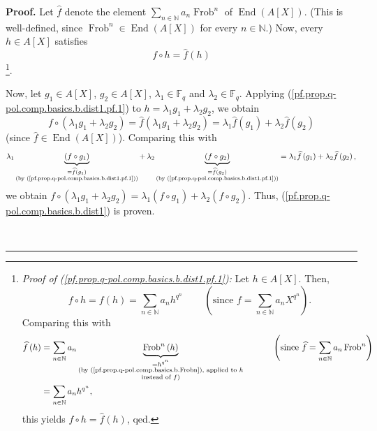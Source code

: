 \documentclass[numbers=enddot,12pt,final,onecolumn,notitlepage]{scrartcl}%
\theoremstyle{definition}
\newenvironment{proof}[1][Proof]{\noindent\textbf{#1.} }{\ \rule{0.5em}{0.5em}}
\let\sumnonlimits\sum
\renewcommand{\sum}{\sumnonlimits\limits}
\begin{document}
\begin{proof}
Let $\widehat{f}$ denote the element $\sum_{n\in\mathbb{N}}a_{n}%
\operatorname*{Frob}\nolimits^{n}$ of $\operatorname*{End}\left(  A\left[
X\right]  \right)  $. (This is well-defined, since $\operatorname*{Frob}%
\nolimits^{n}\in\operatorname*{End}\left(  A\left[  X\right]  \right)  $ for
every $n\in\mathbb{N}$.) Now, every $h\in A\left[  X\right]  $ satisfies%
\begin{equation}
f\circ h=\widehat{f}\left(  h\right)
\label{pf.prop.q-pol.comp.basics.b.dist1.pf.1}%
\end{equation}
\footnote{\textit{Proof of (\ref{pf.prop.q-pol.comp.basics.b.dist1.pf.1}):}
Let $h\in A\left[  X\right]  $. Then,%
\[
f\circ h=f\left(  h\right)  =\sum_{n\in\mathbb{N}}a_{n}h^{q^{n}}%
\ \ \ \ \ \ \ \ \ \ \left(  \text{since }f=\sum_{n\in\mathbb{N}}a_{n}X^{q^{n}%
}\right)  .
\]
Comparing this with%
\begin{align*}
\widehat{f}\left(  h\right)   &  =\sum_{n\in\mathbb{N}}a_{n}%
\underbrace{\operatorname*{Frob}\nolimits^{n}\left(  h\right)  }%
_{\substack{=h^{q^{n}}\\\text{(by (\ref{pf.prop.q-pol.comp.basics.b.Frobn}),
applied to }h\\\text{instead of }f\text{)}}}\ \ \ \ \ \ \ \ \ \ \left(
\text{since }\widehat{f}=\sum_{n\in\mathbb{N}}a_{n}\operatorname*{Frob}%
\nolimits^{n}\right) \\
&  =\sum_{n\in\mathbb{N}}a_{n}h^{q^{n}},
\end{align*}
this yields $f\circ h=\widehat{f}\left(  h\right)  $, qed.}.

Now, let $g_{1}\in A\left[  X\right]  $, $g_{2}\in A\left[  X\right]  $,
$\lambda_{1}\in\mathbb{F}_{q}$ and $\lambda_{2}\in\mathbb{F}_{q}$. Applying
(\ref{pf.prop.q-pol.comp.basics.b.dist1.pf.1}) to $h=\lambda_{1}g_{1}%
+\lambda_{2}g_{2}$, we obtain%
\[
f\circ\left(  \lambda_{1}g_{1}+\lambda_{2}g_{2}\right)  =\widehat{f}\left(
\lambda_{1}g_{1}+\lambda_{2}g_{2}\right)  =\lambda_{1}\widehat{f}\left(
g_{1}\right)  +\lambda_{2}\widehat{f}\left(  g_{2}\right)
\]
(since $\widehat{f}\in\operatorname*{End}\left(  A\left[  X\right]  \right)
$). Comparing this with%
\[
\lambda_{1}\underbrace{\left(  f\circ g_{1}\right)  }_{\substack{=\widehat{f}%
\left(  g_{1}\right)  \\\text{(by
(\ref{pf.prop.q-pol.comp.basics.b.dist1.pf.1}))}}}+\,\lambda_{2}%
\underbrace{\left(  f\circ g_{2}\right)  }_{\substack{=\widehat{f}\left(
g_{2}\right)  \\\text{(by (\ref{pf.prop.q-pol.comp.basics.b.dist1.pf.1}))}%
}}=\lambda_{1}\widehat{f}\left(  g_{1}\right)  +\lambda_{2}\widehat{f}\left(
g_{2}\right)  ,
\]
we obtain $f\circ\left(  \lambda_{1}g_{1}+\lambda_{2}g_{2}\right)
=\lambda_{1}\left(  f\circ g_{1}\right)  +\lambda_{2}\left(  f\circ
g_{2}\right)  $. Thus, (\ref{pf.prop.q-pol.comp.basics.b.dist1}) is proven.


\end{proof}
\end{document}
